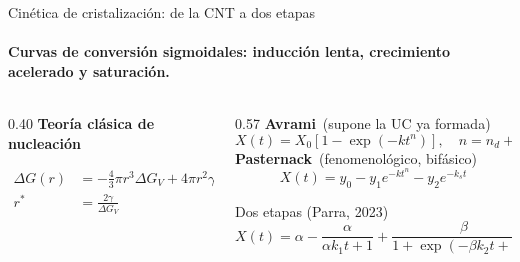 \documentclass[aspectratio=169,11pt]{beamer}
\begin{document}
\begin{frame}{Cinética de cristalización: de la CNT a dos etapas}
  \framesubtitle{Curvas de conversión sigmoidales: inducción lenta, crecimiento acelerado y saturación.}
  \begin{columns}[c,onlytextwidth]
    \begin{column}{0.40\textwidth}
      \centering
      {\color{azul}\bfseries\small Teoría clásica de nucleación}\\[0.2em]
      \small
      \begin{align}
        \Delta G(r) &= -\tfrac{4}{3}\pi r^{3}\Delta G_V + 4\pi r^{2}\gamma \tag{3}\\
        r^{*} &= \frac{2\gamma}{\Delta G_V} \tag{4}
      \end{align}
    \end{column}
    \begin{column}{0.57\textwidth}
      \small
      {\color{azul}\bfseries Avrami}\ {\footnotesize (supone la UC ya formada)}
      \begin{equation}
        X(t) = X_0\left[1-\exp\!\left(-kt^{n}\right)\right],\quad n=n_d+n_N \tag{5}
      \end{equation}
      {\color{azul}\bfseries Pasternack}\ {\footnotesize (fenomenológico, bifásico)}
      \begin{equation}
        X(t) = y_0 - y_1 e^{-kt^{n}} - y_2 e^{-k_s t} \tag{6}
      \end{equation}
      \vspace{-0.6em}
      \begin{block}{Dos etapas (Parra, 2023)}
        \vspace{-0.4em}
        \begin{equation}
          X(t) = \alpha - \frac{\alpha}{\alpha k_1 t + 1} + \frac{\beta}{1+\exp\!\left(-\beta k_2 t + D\right)} \tag{7}
        \end{equation}
      \end{block}
    \end{column}
  \end{columns}
\end{frame}
\end{document}
